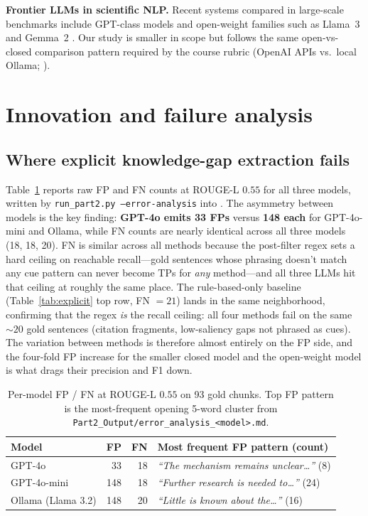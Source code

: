 \documentclass{article}
\begin{document}
\textbf{Frontier LLMs in scientific NLP.} Recent systems compared in large-scale benchmarks include GPT-class models and open-weight families such as Llama~3 and Gemma~2 \citep{openai2023gpt4,dubey2024llama3,gemmateam2024gemma2}. Our study is smaller in scope but follows the same open-vs-closed comparison pattern required by the course rubric (OpenAI APIs vs.\ local Ollama; \citealt{openaiapi,ollama}).

\section{Innovation and failure analysis}
\label{sec:fail}

\subsection{Where explicit knowledge-gap extraction fails}
Table~\ref{tab:fpfn} reports raw FP and FN counts at ROUGE-L $0.55$ for all three models, written by \texttt{run\_part2.py --error-analysis} into . The asymmetry between models is the key finding: \textbf{GPT-4o emits 33 FPs} versus \textbf{148 each} for GPT-4o-mini and Ollama, while FN counts are nearly identical across all three models (18, 18, 20). FN is similar across all methods because the post-filter regex sets a hard ceiling on reachable recall---gold sentences whose phrasing doesn't match any cue pattern can never become TPs for \emph{any} method---and all three LLMs hit that ceiling at roughly the same place. The rule-based-only baseline (Table~\ref{tab:explicit} top row, FN $=21$) lands in the same neighborhood, confirming that the regex \emph{is} the recall ceiling: all four methods fail on the same $\sim 20$ gold sentences (citation fragments, low-saliency gaps not phrased as cues). The variation between methods is therefore almost entirely on the FP side, and the four-fold FP increase for the smaller closed model and the open-weight model is what drags their precision and F1 down.

\begin{table}[h]
\centering
\caption{Per-model FP / FN at ROUGE-L $0.55$ on 93 gold chunks. Top FP pattern is the most-frequent opening 5-word cluster from \texttt{Part2\_Output/error\_analysis\_<model>.md}.}
\label{tab:fpfn}
\begin{tabular}{lrrl}
\toprule
Model & FP & FN & Most frequent FP pattern (count) \\
\midrule
GPT-4o            &  33 & 18 & \emph{``The mechanism remains unclear\ldots''} (8)\\
GPT-4o-mini       & 148 & 18 & \emph{``Further research is needed to\ldots''} (24)\\
Ollama (Llama 3.2)& 148 & 20 & \emph{``Little is known about the\ldots''} (16)\\
\bottomrule
\end{tabular}
\end{table}
\end{document}
